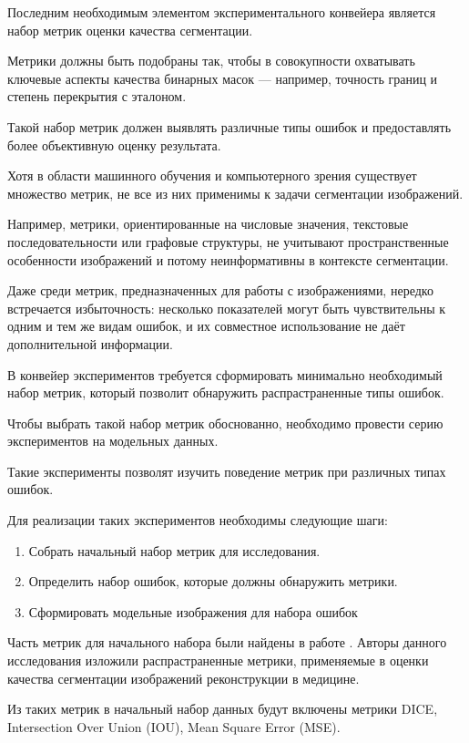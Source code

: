 Последним необходимым элементом экспериментального конвейера является набор метрик оценки качества сегментации.

Метрики должны быть подобраны так, чтобы в совокупности охватывать ключевые аспекты качества бинарных масок — например, точность границ и степень перекрытия с эталоном. 

Такой набор метрик должен выявлять различные типы ошибок и предоставлять более объективную оценку результата.

Хотя в области машинного обучения и компьютерного зрения существует множество метрик, не все из них применимы к задачи сегментации изображений. 

Например, метрики, ориентированные на числовые значения, текстовые последовательности или графовые структуры, не учитывают пространственные особенности изображений и потому неинформативны в контексте сегментации.

Даже среди метрик, предназначенных для работы с изображениями, нередко встречается избыточность: несколько показателей могут быть чувствительны к одним и тем же видам ошибок, и их совместное использование не даёт дополнительной информации.

В конвейер экспериментов требуется сформировать минимально необходимый набор  метрик, который позволит обнаружить распрастраненные типы ошибок.

Чтобы выбрать такой набор метрик обоснованно, необходимо провести серию экспериментов на модельных данных.

Такие эксперименты позволят изучить поведение метрик при различных типах ошибок.

Для реализации таких экспериментов необходимы следующие шаги:

\begin{enumerate}
    \item Собрать начальный набор метрик для исследования.
    \item Определить набор ошибок, которые должны обнаружить метрики.
    \item Сформировать модельные изображения для набора ошибок
\end{enumerate}

Часть метрик для начального набора были найдены в работе \cite{taha2015metrics}. Авторы данного исследования изложили распрастраненные метрики, применяемые в оценки качества сегментации изображений реконструкции в медицине.

Из таких метрик в начальный набор данных будут включены метрики DICE, Intersection Over Union (IOU), Mean Square Error (MSE).

